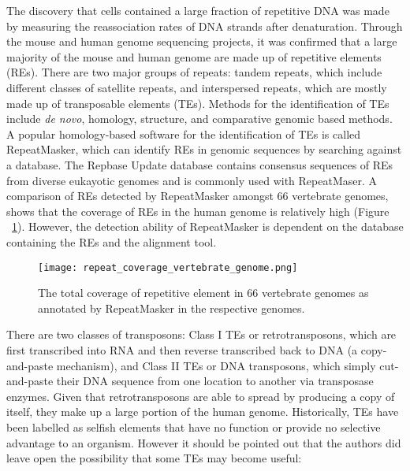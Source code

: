 The discovery that cells contained a large fraction of repetitive DNA was made by measuring the reassociation rates of DNA strands after denaturation\cite{Britten1968}. Through the mouse\cite{pmid12466850} and human\cite{venter2001sequence, lander2001initial} genome sequencing projects, it was confirmed that a large majority of the mouse and human genome are made up of repetitive elements (REs). There are two major groups of repeats: tandem repeats, which include different classes of satellite repeats, and interspersed repeats, which are mostly made up of transposable elements (TEs)\cite{pmid9666329}. Methods for the identification of TEs include \textit{de novo}, homology, structure, and comparative genomic based methods\cite{Bergman01112007}. A popular homology-based software for the identification of TEs is called RepeatMasker, which can identify REs in genomic sequences by searching against a database\cite{pmid19274634}. The Repbase Update database contains consensus sequences of REs from diverse eukayotic genomes and is commonly used with RepeatMaser\cite{pmid16093699}. A comparison of REs detected by RepeatMasker amongst 66 vertebrate genomes, shows that the coverage of REs in the human genome is relatively high (Figure ~\ref{fig:repeat_coverage_vertebrate_genome}). However, the detection ability of RepeatMasker is dependent on the database containing the REs and the alignment tool.

\begin{figure}[!ht]
   \centering
   \texttt{[image: repeat\_coverage\_vertebrate\_genome.png]}
   \caption[Coverage of repetitive elements in vertebrate genomes]{The total coverage of repetitive element in 66 vertebrate genomes as annotated by RepeatMasker in the respective genomes\cite{tang2014repcoverage}.}
   \label{fig:repeat_coverage_vertebrate_genome}
\end{figure}

There are two classes of transposons: Class I TEs or retrotransposons, which are first transcribed into RNA and then reverse transcribed back to DNA (a copy-and-paste mechanism), and Class II TEs or DNA transposons, which simply cut-and-paste their DNA sequence from one location to another via transposase enzymes. Given that retrotransposons are able to spread by producing a copy of itself, they make up a large portion of the human genome. Historically, TEs have been labelled as selfish elements that have no function or provide no selective advantage to an organism\cite{doolittle1980selfish, orgel1980selfish}. However it should be pointed out that the authors did leave open the possibility that some TEs may become useful:

